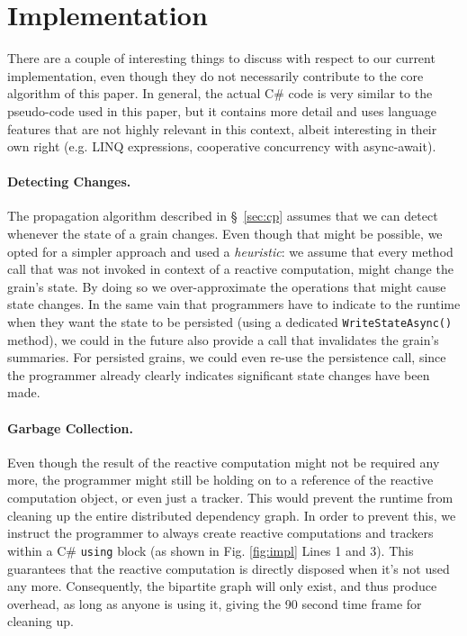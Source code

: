 \section{Implementation} \label{sec:implementation}
There are a couple of interesting things to discuss with respect to our current implementation, even though they do not necessarily contribute to the core algorithm of this paper. In general, the actual C\# code is very similar to the pseudo-code used in this paper, but it contains more detail and uses language features that are not highly relevant in this context, albeit interesting in their own right (e.g. LINQ expressions, cooperative concurrency with async-await).


\paragraph{Detecting Changes.} The propagation algorithm described in \S~\ref{sec:cp} assumes that we can detect whenever the state of a grain changes. Even though that might be possible, we opted for a simpler approach and used a \textit{heuristic}: we assume that every method call that was not invoked in context of a reactive computation, might change the grain's state. By doing so we over-approximate the operations that might cause state changes. In the same vain that programmers have to indicate to the runtime when they want the state to be persisted (using a dedicated \texttt{WriteStateAsync()} method), we could in the future also provide a call that invalidates the grain's summaries. For persisted grains, we could even re-use the persistence call, since the programmer already clearly indicates significant state changes have been made.

\paragraph{Garbage Collection.} Even though the result of the reactive computation might not be required any more, the programmer might still be holding on to a reference of the reactive computation object, or even just a tracker. This would prevent the runtime from cleaning up the entire distributed dependency graph. In order to prevent this, we instruct the programmer to always create reactive computations and trackers within a C\# \texttt{using} block (as shown in Fig. \ref{fig:impl} Lines 1 and 3). This guarantees that the reactive computation is directly disposed when it's not used any more. Consequently, the bipartite graph will only exist, and thus produce overhead, as long as anyone is using it, giving the 90 second time frame for cleaning up.


